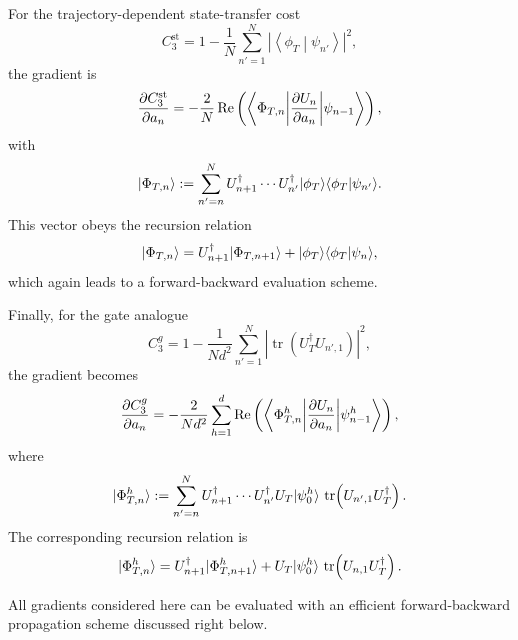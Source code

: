For the trajectory-dependent state-transfer cost
\begin{equation}
C_3^{\mathrm{st}}
=
1-\frac{1}{N}\sum_{n'=1}^N
\left|
\left\langle \phi_T \middle| \psi_{n'} \right\rangle
\right|^2,
\end{equation}
the gradient is
\begin{equation}
\label{state time gradient}
\frac{\partial C_3^{\mathrm{st}}}{\partial a_n}
=
-\frac{2}{N}
\operatorname{Re}\left(
\left\langle \Phi_{T,n} \middle| \frac{\partial U_n}{\partial a_n} \middle| \psi_{n-1} \right\rangle
\right),
\end{equation}
with
\begin{equation}
|\Phi_{T,n}\rangle
:=
\sum_{n'=n}^N
U_{n+1}^\dagger \cdots U_{n'}^\dagger
|\phi_T\rangle
\langle \phi_T | \psi_{n'} \rangle.
\end{equation}
This vector obeys the recursion relation
\begin{equation}
|\Phi_{T,n}\rangle
=
U_{n+1}^\dagger |\Phi_{T,n+1}\rangle
+
|\phi_T\rangle\langle \phi_T | \psi_n \rangle,
\end{equation}
which again leads to a forward-backward evaluation scheme.

Finally, for the gate analogue
\begin{equation}
C_3^{g}
=
1-\frac{1}{N d^2}\sum_{n'=1}^N
\left|
\operatorname{tr}\!\left(U_T^\dagger U_{n',1}\right)
\right|^2,
\end{equation}
the gradient becomes
\begin{equation}
\frac{\partial C_3^g}{\partial a_n}
=
-\frac{2}{N d^2}
\sum_{h=1}^d
\operatorname{Re}\left(
\left\langle \Phi_{T,n}^h \middle| \frac{\partial U_n}{\partial a_n} \middle| \psi_{n-1}^h \right\rangle
\right),
\end{equation}
where
\begin{equation}
|\Phi_{T,n}^h\rangle
:=
\sum_{n'=n}^N
U_{n+1}^\dagger \cdots U_{n'}^\dagger
U_T |\psi_0^h\rangle\,
\operatorname{tr}\!\left(U_{n',1}U_T^\dagger\right).
\end{equation}
The corresponding recursion relation is
\begin{equation}
|\Phi_{T,n}^h\rangle
=
U_{n+1}^\dagger |\Phi_{T,n+1}^h\rangle
+
U_T |\psi_0^h\rangle\,
\operatorname{tr}\!\left(U_{n,1}U_T^\dagger\right).
\end{equation}

All gradients considered here can be evaluated with an efficient forward-backward propagation scheme discussed right below.


